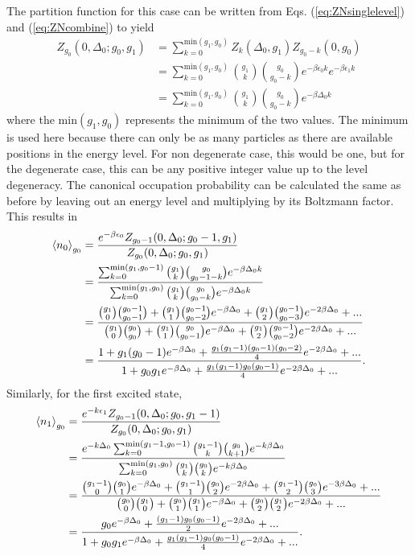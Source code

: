 The partition function for this case can be written from Eqs. (\ref{eq:ZNsinglelevel}) and (\ref{eq:ZNcombine}) to yield
\begin{align}
    Z_{g_0}(0,\Delta_0;g_0,g_1)&=\sum_{k=0}^{\text{min}(g_1,g_0)} Z_k(\Delta_0,g_1)Z_{g_0-k}(0,g_0)\nonumber\\
    &=\sum_{k=0}^{\text{min}(g_1,g_0)} {g_1 \choose k}{g_0\choose g_0-k} e^{-\beta \epsilon_0 k}e^{-\beta \epsilon_1 k}\nonumber\\
    &=\sum_{k=0}^{\text{min}(g_1,g_0)} {g_1 \choose k}{g_0\choose g_0-k} e^{-\beta \Delta_0 k}
\end{align}
where the $\text{min}(g_1,g_0)$ represents the minimum of the two values. The minimum is used here because there can only be as many particles as there are available positions in the energy level. For non degenerate case, this would be one, but for the degenerate case, this can be any positive integer value up to the level degeneracy. The canonical occupation probability can be calculated the same as before by leaving out an energy level and multiplying by its Boltzmann factor. This results in 
\begin{align}
    \left<{n_0}\right>_{g_0}&=\frac{e^{-\beta \epsilon_0}Z_{g_0-1}(0,\Delta_0;g_0-1,g_1)}{Z_{g_0}(0,\Delta_0;g_0,g_1)}\nonumber\\
    &=\frac{\sum_{k=0}^{\text{min}(g_1,g_0-1)} {g_1 \choose k}{g_0\choose g_0-1-k} e^{-\beta \Delta_0 k}}{\sum_{k=0}^{\text{min}(g_1,g_0)} {g_1 \choose k}{g_0\choose g_0-k} e^{-\beta \Delta_0 k }}\nonumber\\
    &=\frac{{g_1\choose 0}{g_0-1\choose g_0-1}+{g_1 \choose 1}{g_0-1\choose g_0-2}e^{-\beta\Delta_0}+{g_1\choose 2}{g_0-1\choose g_0-3}e^{-2\beta\Delta_0}+...}{{g_1\choose 0}{g_0\choose g_0}+{g_1 \choose 1}{g_0\choose g_0-1}e^{-\beta\Delta_0}+{g_1\choose 2}{g_0-1\choose g_0-2}e^{-2\beta\Delta_0}+...}\nonumber\\
    &=\frac{1+g_1(g_0-1)e^{-\beta\Delta_0}+\frac{g_1(g_1-1)(g_0-1)(g_0-2)}{4}e^{-2\beta\Delta_0}+...}{1+g_0g_1e^{-\beta\Delta_0}+\frac{g_1(g_1-1)g_0(g_0-1)}{4}e^{-2\beta\Delta_0}+...}.
\end{align}
Similarly, for the first excited state,
\begin{align}
    \left<{n_1}\right>_{g_0}&=\frac{e^{-k\epsilon_1} Z_{g_0-1}(0,\Delta_0;g_0,g_1-1)}{Z_{g_0}(0,\Delta_0;g_0,g_1)}\nonumber\\
    &=\frac{e^{-k\Delta_0}\sum_{k=0}^{\text{min}(g_1-1,g_0-1)} {g_1-1\choose k}{g_0 \choose k+1} e^{-k\beta\Delta_0}}{\sum_{k=0}^{\text{min}(g_1,g_0)} {g_1\choose k}{g_0 \choose k} e^{-k\beta\Delta_0}}\nonumber\\
    &=\frac{{g_1-1\choose 0}{g_0\choose 1} e^{-\beta\Delta_0} +{g_1-1\choose 1}{g_0\choose 2} e^{-2\beta\Delta_0}+{g_1-1\choose 2}{g_0\choose 3}e^{-3\beta\Delta_0}+...}{{g_0\choose 0}{g_1\choose 0}+{g_0\choose 1}{g_1\choose 1}e^{-\beta\Delta_0}+{g_0\choose 2}{g_1\choose 2}e^{-2\beta\Delta_0}+...}\nonumber\\
    &=\frac{g_0e^{-\beta\Delta_0}+\frac{(g_1-1)g_0(g_0-1)}{2}e^{-2\beta\Delta_0}+...}{1+g_0g_1 e^{-\beta\Delta_0}+\frac{g_1(g_1-1)g_0(g_0-1)}{4}e^{-2\beta\Delta_0}+...}.
\end{align} 
